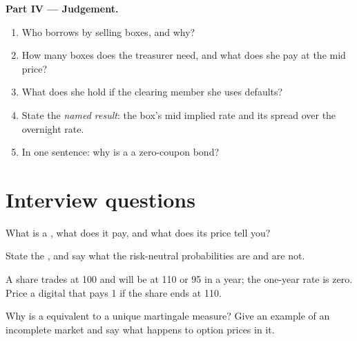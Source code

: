 \begin{problem}
\medskip\noindent\textbf{Part IV --- Judgement.}
\begin{enumerate}[resume]
\item Who borrows by selling boxes, and why?
\item How many boxes does the treasurer need, and what does she pay at the mid price?
\item What does she hold if the clearing member she uses defaults?
\item State the \emph{named result}: the box's mid implied rate and its spread over the overnight rate.
\item In one sentence: why is a  a zero-coupon bond?
\end{enumerate}
\end{problem}

\section{Interview questions}

\begin{interviewq}\label{iq:dv:no-arbitrage-and-the-fundamental-theorems:1}
What is a , what does it pay, and what does its price tell you?
\end{interviewq}

\begin{interviewq}\label{iq:dv:no-arbitrage-and-the-fundamental-theorems:2}
State the , and say what the risk-neutral
probabilities are and are not.
\end{interviewq}

\begin{interviewq}\label{iq:dv:no-arbitrage-and-the-fundamental-theorems:3}
A share trades at 100 and will be at 110 or 95 in a year; the one-year rate is
zero. Price a digital that pays 1 if the share ends at 110.
\end{interviewq}

\begin{interviewq}\label{iq:dv:no-arbitrage-and-the-fundamental-theorems:4}
Why is a  equivalent to a unique martingale measure? Give an
example of an incomplete market and say what happens to option prices in it.
\end{interviewq}


